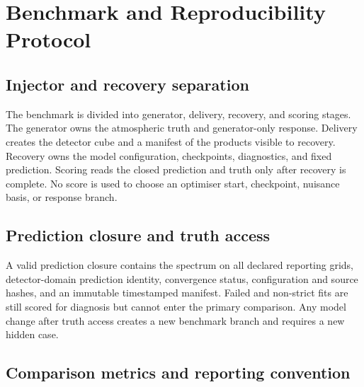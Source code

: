 \section{Benchmark and Reproducibility Protocol}
\label{app:benchmarking}

\subsection{Injector and recovery separation}

The benchmark is divided into generator, delivery, recovery, and scoring stages.
The generator owns the atmospheric truth and generator-only response. Delivery
creates the detector cube and a manifest of the products visible to recovery.
Recovery owns the model configuration, checkpoints, diagnostics, and fixed
prediction. Scoring reads the closed prediction and truth only after recovery is
complete. No score is used to choose an optimiser start, checkpoint, nuisance
basis, or response branch.

\subsection{Prediction closure and truth access}

A valid prediction closure contains the spectrum on all declared reporting
grids, detector-domain prediction identity, convergence status, configuration and
source hashes, and an immutable timestamped manifest. Failed and non-strict fits
are still scored for diagnosis but cannot enter the primary comparison. Any model
change after truth access creates a new benchmark branch and requires a new hidden
case.

\subsection{Comparison metrics and reporting convention}

